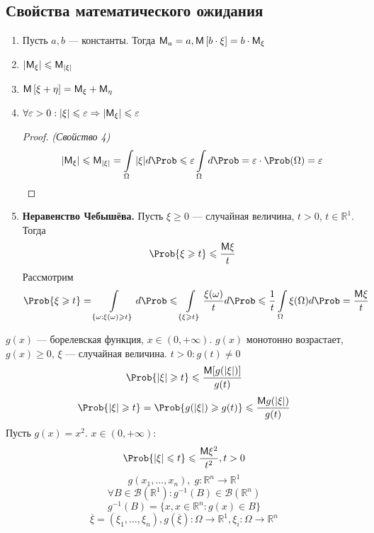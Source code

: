 \subsection{Свойства математического ожидания}
\begin{enumerate}
  \item Пусть $a, b$ --- константы. Тогда $\mathsf{M}_a = a, \mathsf{M} \left[ b \cdot \xi \right] = b \cdot \mathsf{M}_{\xi}$
  \item $|\mathsf{M}_{\xi}| \leqslant \mathsf{M}_{|\xi|}$
  \item $\mathsf{M} \left[ \xi + \eta \right] = \mathsf{M}_{\xi} + \mathsf{M}_{\eta}$
  \item $\forall \varepsilon > 0 : |\xi| \leqslant \varepsilon \Rightarrow |\mathsf{M}_{\xi}| \leqslant \varepsilon$
  \begin{proof} \textit{(Свойство 4)}
    \[
      |\MExpect_{\xi}| \leqslant \MExpect_{|\xi|} = \int\limits_{\Omega} |\xi| d \Prob \leqslant \varepsilon \int\limits_{\Omega} d \Prob = \varepsilon \cdot \Prob(\Omega) = \varepsilon
    \]
  \end{proof}
  \item \textbf{Неравенство Чебышёва.} Пусть $\xi \geqslant 0$ --- случайная величина, $t > 0$, $t \in \mathbb{R}^1$. Тогда
  \[
    \Prob \{ \xi \geqslant t \} \leqslant \frac{\MExpect \xi}{t}
  \]
  Рассмотрим
  \[
    \Prob \{ \xi \geqslant t \} = \int\limits_{\{ \omega: \xi(\omega) \geqslant t\}} d \Prob \leqslant \int\limits_{\{ \xi \geqslant t \}} \frac{\xi(\omega)}{t} d \Prob \leqslant \frac{1}{t} \int\limits_{\Omega} \xi(\Omega) d \Prob = \frac{\MExpect \xi}{t}
  \]
\end{enumerate}
\begin{conclusion}
  $g(x)$ --- борелевская функция, $x \in (0, +\infty)$. $g(x)$ монотонно возрастает, $g(x) \geqslant 0$, $\xi$ --- случайная величина. $t > 0: g(t) \not= 0$
  \[
    \Prob \{ |\xi| \geqslant t \} \leqslant \frac{\MExpect [g(|\xi|)]}{g(t)}
  \]
  \[
    \Prob \{ |\xi| \geqslant t \} = \Prob \{ g(|\xi|) \geqslant g(t) \} \leqslant \frac{\MExpect g(|\xi|)}{g(t)}
  \]
  Пусть $g(x) = x^2$. $x \in (0, +\infty)$:
  \[
    \Prob \{ |\xi| \leqslant t \} \leqslant \frac{\MExpect \xi^2}{t^2}, t > 0
  \]
  \[
    g(x_1, \ldots, x_n), \; g: \mathbb{R}^n \to \mathbb{R}^1
  \]
  \[
    \forall B \in \mathcal{B} (\mathbb{R}^1) : g^{-1}(B) \in \mathcal{B} (\mathbb{R}^n)
  \]
  \[
    g^{-1} (B) = \{ x, x \in \mathbb{R}^n : g(x) \in B \}
  \]
  \[
    \overline{\xi} = (\xi_1, \ldots, \xi_n), g(\overline{\xi}) : \Omega \to \mathbb{R}^1, \xi_i: \Omega \to \mathbb{R}^n
  \]
\end{conclusion}
